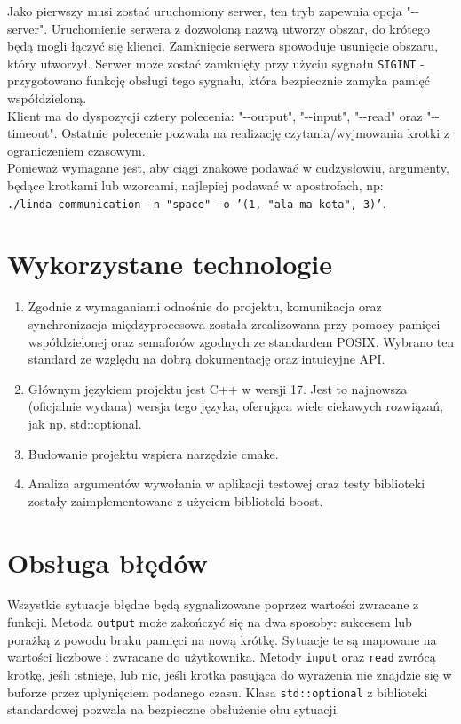 \documentclass[a4paper]{article}
\begin{document}
	Jako pierwszy musi zostać uruchomiony serwer, ten tryb zapewnia opcja "-{}-server". Uruchomienie serwera z dozwoloną nazwą utworzy obszar, do krótego będą mogli łączyć się klienci. Zamknięcie serwera spowoduje usunięcie obszaru, który utworzył. Serwer może zostać zamknięty przy użyciu sygnału \texttt{SIGINT} - przygotowano funkcję obsługi tego sygnału, która bezpiecznie zamyka pamięć współdzieloną.\\
	
	Klient ma do dyspozycji cztery polecenia: "-{}-output", "-{}-input", "-{}-read" oraz "-{}-timeout". Ostatnie polecenie pozwala na realizację czytania/wyjmowania krotki z ograniczeniem czasowym.\\
	
	Ponieważ wymagane jest, aby ciągi znakowe podawać w cudzysłowiu, argumenty, będące krotkami lub wzorcami, najlepiej podawać w apostrofach, np:\\ \texttt{./linda-communication -n "space" -o '(1, "ala ma kota", 3)'}.
	
	\section{Wykorzystane technologie}
	\begin{enumerate}
		\item Zgodnie z wymaganiami odnośnie do projektu, komunikacja oraz synchronizacja międzyprocesowa została zrealizowana przy pomocy pamięci współdzielonej oraz semaforów zgodnych ze standardem POSIX. Wybrano ten standard ze względu na dobrą dokumentację oraz intuicyjne API.
		\item Głównym językiem projektu jest C++ w wersji 17. Jest to najnowsza (oficjalnie wydana) wersja tego języka, oferująca wiele ciekawych rozwiązań, jak np. std::optional.
		\item Budowanie projektu wspiera narzędzie cmake.
		\item Analiza argumentów wywołania w aplikacji testowej oraz testy biblioteki zostały zaimplementowane z użyciem biblioteki boost. 
	\end{enumerate}
	

	\section{Obsługa błędów}
	Wszystkie sytuacje błędne będą sygnalizowane poprzez wartości zwracane z funkcji.
	Metoda \texttt{output} może zakończyć się na dwa sposoby: sukcesem lub porażką z powodu braku pamięci na nową krótkę. Sytuacje te są mapowane na wartości liczbowe i zwracane do użytkownika.
	Metody \texttt{input} oraz \texttt{read} zwrócą krotkę, jeśli istnieje, lub nic, jeśli krotka pasująca do wyrażenia nie znajdzie się w buforze przez upłynięciem podanego czasu. Klasa \texttt{std::optional} z biblioteki standardowej pozwala na bezpieczne obsłużenie obu sytuacji.
	
\end{document}
